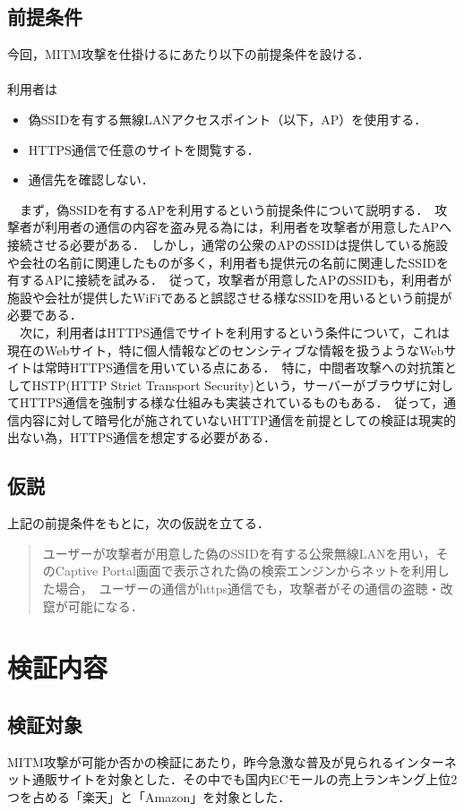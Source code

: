 \documentclass[dvipdfmx]{jsarticle}
\begin{document}
        \subsection{前提条件}
            今回，MITM攻撃を仕掛けるにあたり以下の前提条件を設ける．\\
            \\
            利用者は
        \begin{itemize}
            \item 偽SSIDを有する無線LANアクセスポイント（以下，AP）を使用する．
            \item HTTPS通信で任意のサイトを閲覧する．
            \item 通信先を確認しない．
        \end{itemize}
        　まず，偽SSIDを有するAPを利用するという前提条件について説明する．\
        攻撃者が利用者の通信の内容を盗み見る為には，利用者を攻撃者が用意したAPへ接続させる必要がある．\
        しかし，通常の公衆のAPのSSIDは提供している施設や会社の名前に関連したものが多く，利用者も提供元の名前に関連したSSIDを有するAPに接続を試みる．\
        従って，攻撃者が用意したAPのSSIDも，利用者が施設や会社が提供したWiFiであると誤認させる様なSSIDを用いるという前提が必要である．\\
        　次に，利用者はHTTPS通信でサイトを利用するという条件について，これは現在のWebサイト，特に個人情報などのセンシティブな情報を扱うようなWebサイトは常時HTTPS通信を用いている点にある．\
        特に，中間者攻撃への対抗策としてHSTP(HTTP Strict Transport Security)という，サーバーがブラウザに対してHTTPS通信を強制する様な仕組みも実装されているものもある．\
        従って，通信内容に対して暗号化が施されていないHTTP通信を前提としての検証は現実的出ない為，HTTPS通信を想定する必要がある．
        \subsection{仮説}
            上記の前提条件をもとに，次の仮説を立てる．
            \begin{quote}
                ユーザーが攻撃者が用意した偽のSSIDを有する公衆無線LANを用い，そのCaptive Portal画面で表示された偽の検索エンジンからネットを利用した場合，\
                ユーザーの通信がhttps通信でも，攻撃者がその通信の盗聴・改竄が可能になる．
            \end{quote}
    \section{検証内容}
        \subsection{検証対象}
            MITM攻撃が可能か否かの検証にあたり，昨今急激な普及が見られるインターネット通販サイトを対象とした．その中でも国内ECモールの売上ランキング上位2つを占める「楽天」と「Amazon」を対象とした．
\end{document}
